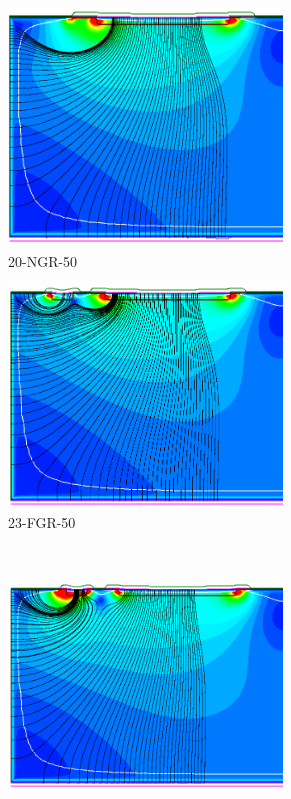 \begin{figure}[htbp]
  \centering
  \begin{subfigure}[b]{0.45\textwidth}
    \includegraphics[width=0.8\textwidth]{figures/ActiveEdge/streamlines_20-NGR-50.png}
    \caption{20-NGR-50}
  \end{subfigure}\hfill
  \begin{subfigure}[b]{0.45\textwidth}
    \includegraphics[width=0.8\textwidth]{figures/ActiveEdge/streamlines_23-FGR-50.png}
    \caption{23-FGR-50}
  \end{subfigure}\\
  \begin{subfigure}[b]{0.45\textwidth}
    \includegraphics[width=0.8\textwidth]{figures/ActiveEdge/streamlines_28-GNDGR-50.png}

\end{subfigure}
\end{figure}
